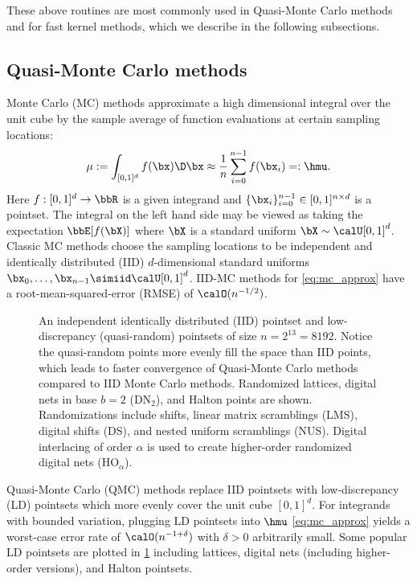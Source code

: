 \documentclass[acmsmall]{acmart}
\begin{document}
These above routines are most commonly used in Quasi-Monte Carlo methods and for fast kernel methods, which we describe in the following subsections. 

\subsection{Quasi-Monte Carlo methods}

Monte Carlo (MC) methods approximate a high dimensional integral over the unit cube by the sample average of function evaluations at certain sampling locations:
\begin{equation}
    \mu := \int_{[0,1]^d} f(\bx) \D \bx \approx \frac{1}{n} \sum_{i=0}^{n-1} f(\bx_i) =: \hmu.
    \label{eq:mc_approx}
\end{equation}
Here $f: [0,1]^d \to \bbR$ is a given integrand and $\{\bx_i\}_{i=0}^{n-1} \in [0,1]^{n \times d}$ is a pointset. The integral on the left hand side may be viewed as taking the expectation $\bbE[f(\bX)]$ where $\bX$ is a standard uniform $\bX \sim \calU[0,1]^d$. Classic MC methods choose the sampling locations to be independent and identically distributed (IID) $d$-dimensional standard uniforms $\bx_0,\dots,\bx_{n-1} \simiid \calU[0,1]^d$. IID-MC methods for \eqref{eq:mc_approx} have a root-mean-squared-error (RMSE) of $\calO(n^{-1/2})$.

\begin{figure}%
    \centering
    \caption{An independent identically distributed (IID) pointset and low-discrepancy (quasi-random) pointsets of size $n=2^{13}=8192$. Notice the quasi-random points more evenly fill the space than IID points, which leads to faster convergence of Quasi-Monte Carlo methods compared to IID Monte Carlo methods. Randomized lattices, digital nets in base $b=2$ (DN${}_{2}$), and Halton points are shown. Randomizations include shifts, linear matrix scramblings (LMS), digital shifts (DS), and nested uniform scramblings (NUS). Digital interlacing of order $\alpha$ is used to create higher-order randomized digital nets (HO${}_\alpha$).}
    \Description[]{}
    \label{fig:pointsets}
\end{figure}

Quasi-Monte Carlo (QMC) methods \citep{niederreiter.qmc_book,dick.digital_nets_sequences_book,kroese.handbook_mc_methods,dick2022lattice,lemieux2009monte,sloan1994lattice} replace IID pointsets with low-discrepancy (LD) pointsets which more evenly cover the unit cube $[0,1]^d$. For integrands with bounded variation, plugging LD pointsets into $\hmu$ \eqref{eq:mc_approx} yields a worst-case error rate of $\calO(n^{-1+\delta})$ with $\delta>0$ arbitrarily small. Some popular LD pointsets are plotted in \cref{fig:pointsets} including lattices, digital nets (including higher-order versions), and Halton pointsets.
\end{document}
